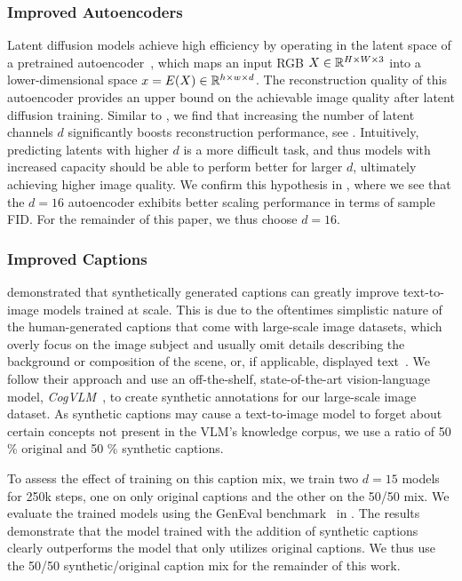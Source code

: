\subsubsection{Improved Autoencoders}
\label{sec:improvedae}
Latent diffusion models achieve high efficiency by operating in the latent space of a pretrained autoencoder~\citep{Rombach_2022}, 
which maps an input RGB  $X\in \mathbb{R}^{H\times W\times 3}$ into a lower-dimensional space $x=E(X) \in \mathbb{R}^{h\times w \times d}$.
The reconstruction quality of this autoencoder provides an upper bound on the achievable image quality after latent diffusion training. 
Similar to \citet{dai2023emu}, we find that increasing the number of latent channels $d$ significantly boosts reconstruction performance, see . Intuitively, predicting latents with higher $d$ is a more difficult task, and thus models with increased capacity should be able to perform better for larger $d$, ultimately achieving higher image quality. We confirm this hypothesis in , where we see that the $d=16$ autoencoder exhibits better scaling performance in terms of sample FID. For the remainder of this paper, we thus choose $d=16$. 

\aereconstructiontable
\horizontalcherries

\subsubsection{Improved Captions}
\label{subsubsec:improvedcaptions}
\citet{betker2023improving} demonstrated that synthetically generated captions can greatly improve text-to-image models trained at scale. This is due to the oftentimes simplistic 
nature of the human-generated captions that come with large-scale image datasets, which overly focus on the image subject and usually omit details describing the background or composition of the scene, or, if applicable, displayed text~\citep{betker2023improving}. 
We follow their approach and use an off-the-shelf, state-of-the-art vision-language model, \emph{CogVLM}~\citep{wang2023cogvlm}, to create synthetic annotations for our large-scale image dataset. As synthetic captions may cause a text-to-image model to forget about certain concepts not present in the VLM's knowledge corpus, we use a  ratio of 50 \% original and 50 \% synthetic captions. 

To assess the effect of training on this caption mix, we train two $d=15$ \modelname models for 250k steps, one on only original captions and the other on the 50/50 mix. 
We evaluate the trained models using the GenEval benchmark~\citep{ghosh2023geneval} in . The results demonstrate that the model trained with the addition of synthetic captions clearly outperforms the model that only utilizes original captions. We thus use the 50/50 synthetic/original caption mix for the remainder of this work. 
\captionstudy


